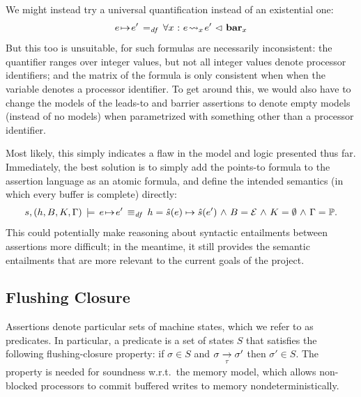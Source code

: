 \documentclass[11pt]{report}
\begin{document}
We might instead try a universal quantification instead of an existential one: \[e \!\mapsto\! e' \operatorname{\;=_{\mathit{df}}\;} \forall x \operatorname{\,:\,} e \!\leadsto_{x}\! e' \operatorname{\,\vartriangleleft\,} \mathbf{bar}_{x} \] But this too is unsuitable, for such formulas are necessarily inconsistent: the quantifier ranges over integer values, but not all integer values denote processor identifiers; and the matrix of the formula is only consistent when when the variable denotes a processor identifier. To get around this, we would also have to change the models of the leads-to and barrier assertions to denote empty models (instead of no models) when parametrized with something other than a processor identifier. 

Most likely, this simply indicates a flaw in the model and logic presented thus far. Immediately, the best solution is to simply add the points-to formula to the assertion language as an atomic formula, and define the intended semantics (in which every buffer is complete) directly: \[ s,(h,B,K,\Gamma) \,\models\, e \!\mapsto\! e' \operatorname{\;\equiv_{\mathit{df}}\;} h = \hat{s}(e) \mapsto \hat{s}(e') \operatorname{\,\wedge\,} B = \mathcal{E} \operatorname{\,\wedge\,} K = \operatorname{\emptyset} \operatorname{\,\wedge\,} \Gamma = \mathbb{P}.\] This could potentially make reasoning about syntactic entailments between assertions more difficult; in the meantime, it still provides the semantic entailments that are more relevant to the current goals of the project. 

\subsection{Flushing Closure}
\label{sec:predicates}

Assertions denote particular sets of machine states, which we refer to as predicates. In particular, a predicate is a set of states $S$ that satisfies the following flushing-closure property: if $\sigma \in S$ and $\sigma \underset{\tau}{\rightarrow} \sigma'$ then $\sigma' \in S$. The property is needed for soundness w.r.t.\ the memory model, which allows non-blocked processors to commit buffered writes to memory nondeterministically.  
\end{document}
